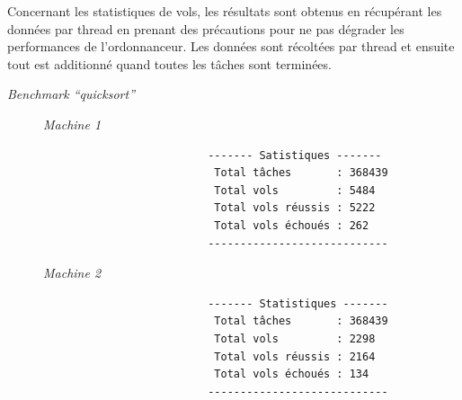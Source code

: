 \documentclass[a4paper]{article}
\def\mone{\textit{Machine 1}} %
\def\mtwo{\textit{Machine 2}} %
\def\qs{\enquote{quicksort}}
\def\bone{\textit{Benchmark \qs}}
\begin{document}
Concernant les statistiques de vols, les résultats sont obtenus en récupérant
les données par thread en prenant des précautions pour ne pas dégrader les
performances de l'ordonnanceur. Les données sont récoltées par thread et ensuite
tout est additionné quand toutes les tâches sont terminées.

\begin{description}
  \item[\bone] \hspace{1em}
        \begin{description}
          \item[\mone] \hspace{1em}
                \begin{samepage}
                  \begin{verbatim}
                    ------- Satistiques -------
                     Total tâches       : 368439
                     Total vols         : 5484
                     Total vols réussis : 5222
                     Total vols échoués : 262
                    ----------------------------
                  \end{verbatim}
                \end{samepage}
          \item[\mtwo] \hspace{1em}
                \begin{samepage}
                  \begin{verbatim}
                    ------- Statistiques -------
                     Total tâches       : 368439
                     Total vols         : 2298
                     Total vols réussis : 2164
                     Total vols échoués : 134
                    ----------------------------
                  \end{verbatim}
                \end{samepage}
        \end{description}


\end{description}
\end{document}

